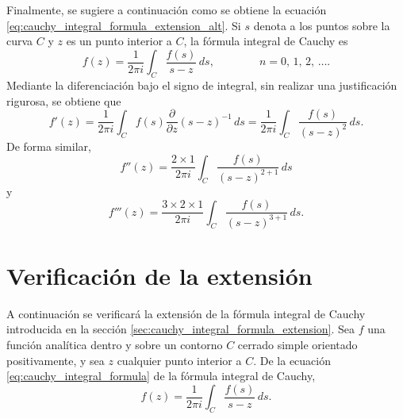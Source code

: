 \documentclass[a4paper]{report}
\begin{document}
Finalmente, se sugiere a continuación como se obtiene la ecuación \ref{eq:cauchy_integral_formula_extension_alt}. Si \(s\) denota a los puntos sobre la curva \(C\) y \(z\) es un punto interior a \(C\), la fórmula integral de Cauchy es
\[
 f(z)=\frac{1}{2\pi i}\int_{C}\frac{f(s)}{s-z}\,ds,
 \qquad\qquad 
 n=0,\,1,\,2,\,\dots. 
\]
Mediante la diferenciación bajo el signo de integral, sin realizar una justificación rigurosa, se obtiene que 
\[
 f'(z)=\frac{1}{2\pi i}\int_{C}f(s)\frac{\partial}{\partial z}(s-z)^{-1}\,ds
 =\frac{1}{2\pi i}\int_{C}\frac{f(s)}{(s-z)^2}\,ds.
\]
De forma similar,
\[
 f''(z)=\frac{2\times1}{2\pi i}\int_{C}\frac{f(s)}{(s-z)^{2+1}}\,ds
\]
y
\[
 f'''(z)=\frac{3\times2\times1}{2\pi i}\int_{C}\frac{f(s)}{(s-z)^{3+1}}\,ds.
\]

\section{Verificación de la extensión}\label{sec:cauchy_integral_formula_extension_verification}

A continuación se verificará la extensión de la fórmula integral de Cauchy introducida en la sección \ref{sec:cauchy_integral_formula_extension}. Sea \(f\) una función analítica dentro y sobre un contorno \(C\) cerrado simple orientado positivamente, y sea \(z\) cualquier punto interior a \(C\). De la ecuación \ref{eq:cauchy_integral_formula} de la fórmula integral de Cauchy,
\begin{equation}\label{eq:cauchy_integral_formula_extension_deduction_cauchy}
 f(z)=\frac{1}{2\pi i}\int_C\frac{f(s)}{s-z}\,ds. 
\end{equation}
\end{document}
